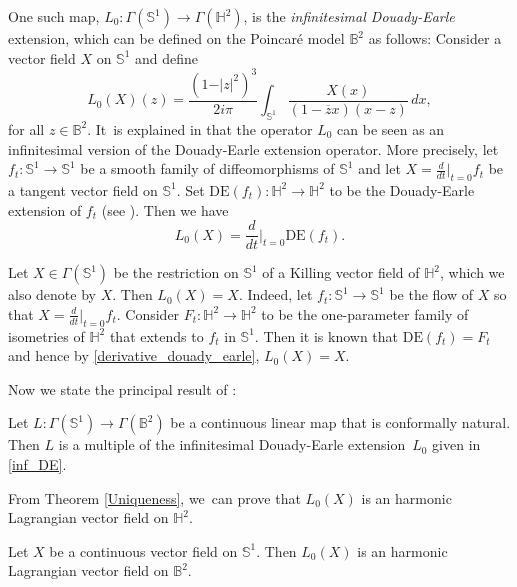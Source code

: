 One such map, $L_0:\Gamma(\mathbb{S}^1) \to \Gamma(\mathbb{H}^2)$, is the \emph{infinitesimal Douady-Earle} extension, which can be defined on the Poincaré model $\mathbb{B}^2$ as follows: Consider a vector field $X$ on $\mathbb{S}^1$ and define
\begin{equation}\label{inf_DE}
L_0(X)(z)=\frac{(1-\vert z\vert^2)^3}{2i\pi}\int_{\mathbb{S}^1}\frac{X(x)}{(1-\overline{z}x)(x-z)}\,dx,
\end{equation}
for all $z\in\mathbb{B}^2$. It~is explained in \cite{Uniqueness_of_operator_L} that the operator $L_0$ can be seen as an infinitesimal version of the Douady-Earle extension operator. More precisely, let \hbox{$f_t: \mathbb{S}^1 \to \mathbb{S}^1$} be a smooth family of diffeomorphisms of $\mathbb{S}^1$ and let $X = \frac{d}{dt}\big|_{t=0} f_t$ be a tangent vector field on $\mathbb{S}^1$. Set $\mathrm{DE}(f_t): \mathbb{H}^2 \to \mathbb{H}^2$ to be the Douady-Earle extension of $f_t$ (see \cite{Douady_Earle}). Then we have
\begin{equation}\label{derivative_douady_earle}
L_0(X)=\frac{d}{dt}\Big\lvert_{ t=0} \mathrm{DE}(f_t).
\end{equation}

\begin{remark}\label{douadyearly_killing}
Let $X \in \Gamma(\mathbb{S}^1)$ be the restriction on $\mathbb{S}^1$ of a Killing vector field of $\mathbb{H}^2$, which we also denote by $X$. Then $L_0(X)=X$. Indeed, let $f_t:\mathbb{S}^1\to\mathbb{S}^1$ be the flow of $X$ so that $X=\frac{d}{dt}\big\lvert_{t=0}f_t$. Consider $F_t: \mathbb{H}^2 \to \mathbb{H}^2$ to be the one-parameter family of isometries of $\mathbb{H}^2$ that extends to $f_t$ in $\mathbb{S}^1$. Then it is known that $\mathrm{DE}(f_t) = F_t$ and hence by \eqref{derivative_douady_earle}, $L_0(X)=X$.
\end{remark}
Now we state the principal result of \cite{Uniqueness_of_operator_L}:

\begin{theorem}\label{Uniqueness}
Let $L:\Gamma(\mathbb{S}^1) \to \Gamma(\mathbb{B}^2)$ be a continuous linear map that is conformally natural. Then $L$ is a multiple of the infinitesimal Douady-Earle extension~$L_0$ given in \eqref{inf_DE}.
\end{theorem}
From Theorem \ref{Uniqueness}, we~can prove that $L_0(X)$ is an harmonic Lagrangian vector field on $\mathbb{H}^2$.
\begin{prop}\label{L_0_harmonic_lagrangian}
Let $X$ be a continuous vector field on $\mathbb{S}^1$. Then $L_0(X)$ is an harmonic Lagrangian vector field on $\mathbb{B}^2$.
\end{prop}

